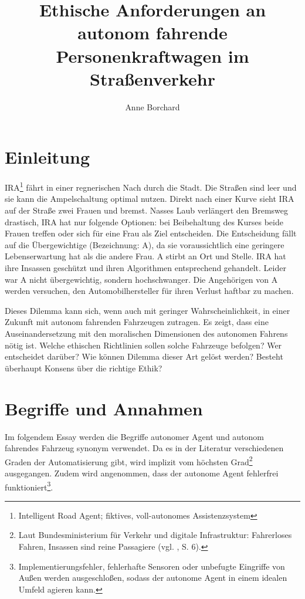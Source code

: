 \documentclass[a4paper, 12pt, titlepage]{scrartcl}
\begin{document}
\author{Anne Borchard}
\title{Ethische Anforderungen an autonom fahrende Personenkraftwagen im Stra\ss enverkehr}
\publishers{Humboldt-Universit\"at zu Berlin}
\maketitle
\tableofcontents
\newpage

\section{Einleitung}
	IRA\footnote{Intelligent Road Agent; fiktives, voll-autonomes Assistenzsystem} fährt in einer regnerischen Nach durch die Stadt. Die Straßen sind leer und sie kann die Ampelschaltung optimal nutzen. Direkt nach einer Kurve sieht IRA auf der Straße zwei Frauen und bremst. Nasses Laub verl\"angert den Bremsweg drastisch, IRA hat nur folgende Optionen: bei Beibehaltung des Kurses beide Frauen treffen oder sich f\"ur eine Frau als Ziel entscheiden. Die Entscheidung fällt auf die \"Ubergewichtige (Bezeichnung: A), da sie voraussichtlich eine geringere Lebenserwartung hat als die andere Frau. A stirbt an Ort und Stelle. IRA hat ihre Insassen geschützt und ihren Algorithmen entsprechend gehandelt. Leider war A nicht übergewichtig, sondern hochschwanger. Die Angehörigen von A werden versuchen, den Automobilhersteller für ihren Verlust haftbar zu machen.
	
	Dieses Dilemma kann sich, wenn auch mit geringer Wahrscheinlichkeit, in einer Zukunft mit autonom fahrenden Fahrzeugen zutragen. Es zeigt, dass eine Auseinandersetzung mit den moralischen Dimensionen des autonomen Fahrens n\"otig ist. Welche ethischen Richtlinien sollen solche Fahrzeuge befolgen? Wer entscheidet dar\"uber? Wie k\"onnen Dilemma dieser Art gel\"ost werden? Besteht \"uberhaupt Konsens \"uber die \glqq richtige\grqq{} Ethik?
\section{Begriffe und Annahmen}
	Im folgendem Essay werden die Begriffe autonomer Agent und autonom fahrendes Fahrzeug synonym verwendet. Da es in der Literatur verschiedenen Graden der Automatisierung gibt, wird implizit vom h\"ochsten Grad\footnote{Laut Bundesministerium für Verkehr und digitale Infrastruktur: Fahrerloses Fahren, Insassen sind reine Passagiere (vgl. \autocite{bmvi2015}, S. 6).} ausgegangen. Zudem wird angenommen, dass der autonome Agent fehlerfrei funktioniert\footnote{Implementierungsfehler, fehlerhafte Sensoren oder unbefugte Eingriffe von Au\ss en werden ausgeschlo\ss en, sodass der autonome Agent in einem idealen Umfeld agieren kann.}.
	
\end{document}
